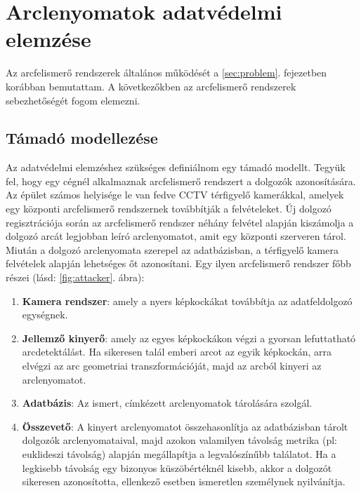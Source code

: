 \section{Arclenyomatok adatvédelmi elemzése}
\label{sec:4}

Az arcfelismerő rendszerek általános működését a \ref{sec:problem}. fejezetben korábban bemutattam. A következőkben az arcfelismerő rendszerek sebezhetőségét fogom elemezni.

\subsection{Támadó modellezése} %
\label{sec:tamado}

Az adatvédelmi elemzéshez szükséges definiálnom egy támadó modellt. Tegyük fel, hogy egy cégnél alkalmaznak arcfelismerő rendszert a dolgozók azonosítására. Az épület számos helyisége le van fedve CCTV térfigyelő kamerákkal, amelyek egy központi arcfelismerő rendszernek továbbítják a felvételeket. Új dolgozó regisztrációja során az arcfelismerő rendszer néhány felvétel alapján kiszámolja a dolgozó arcát legjobban leíró arclenyomatot, amit egy központi szerveren tárol. Miután a dolgozó arclenyomata szerepel az adatbázisban, a térfigyelő kamera felvételek alapján lehetséges őt azonosítani. Egy ilyen arcfelismerő rendszer főbb részei (lásd: \ref{fig:attacker}. ábra): 

\begin{enumerate}
	\item \textbf{Kamera rendszer}: amely a nyers képkockákat továbbítja az adatfeldolgozó egységnek.
	\item \textbf{Jellemző kinyerő}: amely az egyes képkockákon végzi a gyorsan lefuttatható arcdetektálást. Ha sikeresen talál emberi arcot az egyik képkockán, arra elvégzi az arc geometriai transzformációját, majd az arcból kinyeri az arclenyomatot.
	\item \textbf{Adatbázis}: Az ismert, címkézett arclenyomatok tárolására szolgál.
	\item \textbf{Összevető}: A kinyert arclenyomatot összehasonlítja az adatbázisban tárolt dolgozók arclenyomataival, majd azokon valamilyen távolság metrika (pl: euklideszi távolság) alapján megállapítja a legvalószínűbb találatot. Ha a legkisebb távolság egy bizonyos küszöbértéknél kisebb, akkor a dolgozót sikeresen azonosította, ellenkező esetben ismeretlen személynek nyilvánítja.
\end{enumerate}

